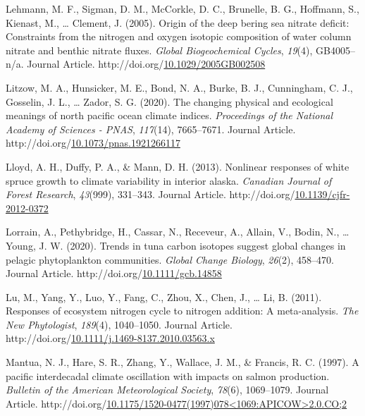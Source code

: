 \documentclass [11pt, proquest] {uwthesis}[2015/03/03]
\newlength{\cslhangindent}
\newenvironment{CSLReferences}%
{\setlength{\parindent}{0pt}%
\everypar{\setlength{\hangindent}{\cslhangindent}}\ignorespaces}%
{\par}
\begin{document}
\begin{CSLReferences}{1}{0}
\leavevmode\hypertarget{ref-Lehmann2005}{}%
Lehmann, M. F., Sigman, D. M., McCorkle, D. C., Brunelle, B. G., Hoffmann, S., Kienast, M., \ldots{} Clement, J. (2005). Origin of the deep bering sea nitrate deficit: Constraints from the nitrogen and oxygen isotopic composition of water column nitrate and benthic nitrate fluxes. \emph{Global Biogeochemical Cycles}, \emph{19}(4), GB4005--n/a. Journal Article. http://doi.org/\href{https://doi.org/10.1029/2005GB002508}{10.1029/2005GB002508}

\leavevmode\hypertarget{ref-Litzow2020}{}%
Litzow, M. A., Hunsicker, M. E., Bond, N. A., Burke, B. J., Cunningham, C. J., Gosselin, J. L., \ldots{} Zador, S. G. (2020). The changing physical and ecological meanings of north pacific ocean climate indices. \emph{Proceedings of the National Academy of Sciences - PNAS}, \emph{117}(14), 7665--7671. Journal Article. http://doi.org/\href{https://doi.org/10.1073/pnas.1921266117}{10.1073/pnas.1921266117}

\leavevmode\hypertarget{ref-Lloyd2013}{}%
Lloyd, A. H., Duffy, P. A., \& Mann, D. H. (2013). Nonlinear responses of white spruce growth to climate variability in interior alaska. \emph{Canadian Journal of Forest Research}, \emph{43}(999), 331--343. Journal Article. http://doi.org/\href{https://doi.org/10.1139/cjfr-2012-0372}{10.1139/cjfr-2012-0372}

\leavevmode\hypertarget{ref-Lorrain2020}{}%
Lorrain, A., Pethybridge, H., Cassar, N., Receveur, A., Allain, V., Bodin, N., \ldots{} Young, J. W. (2020). Trends in tuna carbon isotopes suggest global changes in pelagic phytoplankton communities. \emph{Global Change Biology}, \emph{26}(2), 458--470. Journal Article. http://doi.org/\href{https://doi.org/10.1111/gcb.14858}{10.1111/gcb.14858}

\leavevmode\hypertarget{ref-Lu2011}{}%
Lu, M., Yang, Y., Luo, Y., Fang, C., Zhou, X., Chen, J., \ldots{} Li, B. (2011). Responses of ecosystem nitrogen cycle to nitrogen addition: A meta-analysis. \emph{The New Phytologist}, \emph{189}(4), 1040--1050. Journal Article. http://doi.org/\href{https://doi.org/10.1111/j.1469-8137.2010.03563.x}{10.1111/j.1469-8137.2010.03563.x}

\leavevmode\hypertarget{ref-Mantua1997}{}%
Mantua, N. J., Hare, S. R., Zhang, Y., Wallace, J. M., \& Francis, R. C. (1997). A pacific interdecadal climate oscillation with impacts on salmon production. \emph{Bulletin of the American Meteorological Society}, \emph{78}(6), 1069--1079. Journal Article. http://doi.org/\href{https://doi.org/10.1175/1520-0477(1997)078\%3C1069:APICOW\%3E2.0.CO;2}{10.1175/1520-0477(1997)078\textless1069:APICOW\textgreater2.0.CO;2}


\end{CSLReferences}
\end{document}
